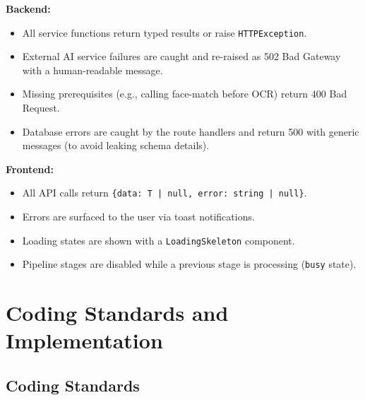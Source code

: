 \textbf{Backend:}
\begin{itemize}
    \item All service functions return typed results or raise \texttt{HTTPException}.
    \item External AI service failures are caught and re-raised as 502 Bad Gateway with a human-readable message.
    \item Missing prerequisites (e.g., calling face-match before OCR) return 400 Bad Request.
    \item Database errors are caught by the route handlers and return 500 with generic messages (to avoid leaking schema details).
\end{itemize}

\textbf{Frontend:}
\begin{itemize}
    \item All API calls return \texttt{\{data: T | null, error: string | null\}}.
    \item Errors are surfaced to the user via toast notifications.
    \item Loading states are shown with a \texttt{LoadingSkeleton} component.
    \item Pipeline stages are disabled while a previous stage is processing (\texttt{busy} state).
\end{itemize}

\chapter{Coding Standards and Implementation}

\section{Coding Standards}

